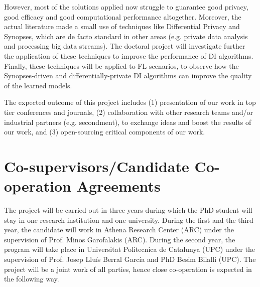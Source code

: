 \documentclass[12pt]{article}
\begin{document}
However, most of the solutions applied now struggle to guarantee good privacy, good efficacy and good computational performance 
altogether. 
Moreover, the actual literature made a small use of techniques like Differential Privacy and Synopses, which are de facto standard in 
other areas (e.g. private data analysis and processing big data streams). The doctoral project will investigate further the application of 
these techniques to improve the performance of DI algorithms. Finally, these techniques will be applied to FL scenarios, to observe 
how the Synopses-driven and differentially-private DI algorithms can improve the quality of the learned models.



The expected outcome of this project includes (1) presentation of our work in top tier conferences
and journals, (2) collaboration with other research teams and/or industrial partners (e.g. secondment), to
exchange ideas and boost the results of our work, and (3) open-sourcing critical components of our work.

\section{Co-supervisors/Candidate Co-operation Agreements}
The project will be carried out in three years during which the PhD student will stay in one research institution and one university. 
During the first and the third year, the candidate will work in Athena Research Center (ARC) under the supervision of Prof. 
Minos Garofalakis (ARC). During the second year, the program will take place in Universitat Politecnica de Catalunya (UPC) under 
the supervision of Prof. Josep Lluís Berral García and PhD Besim Bilalli (UPC). The project will be a joint work of all parties, hence close co-operation is 
expected in the following way.
\end{document}
